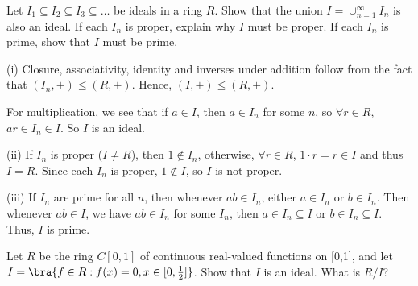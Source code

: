\begin{solution}[\bf Solution.]

\end{solution}


\begin{problem}
Let $I_1 \subseteq I_2 \subseteq I_3 \subseteq \dots$ be ideals in a ring $R$. Show that the union $I = \cup^\infty_{n=1} I_n$ is also an ideal. If each $I_n$ is proper, explain why $I$ must be proper. If each $I_n$ is prime, show that $I$ must be prime.
\end{problem}

\begin{solution}[\bf Solution.] 
\ben
\item [(i)] Closure, associativity, identity and inverses under addition follow from the fact that $(I_n,+) \leq (R,+)$. Hence, $(I,+) \leq (R,+)$.

For multiplication, we see that if $a \in I$, then $a\in I_n$ for some $n$, so $\forall r\in R$, $ar \in I_n \in I$. So $I$ is an ideal.

\item [(ii)] If $I_n$ is proper ($I \neq R$), then $1\notin I_n$, otherwise, $\forall r\in R$, $1\cdot r = r \in I$ and thus $I = R$. Since each $I_n$ is proper, $1\notin I$, so $I$ is not proper. %

\item [(iii)] If $I_n$ are prime for all $n$, then whenever $ab\in I_n$, either $a\in I_n$ or $b\in I_n$. Then whenever $ab\in I$, we have $ab\in I_n$ for some $I_n$, then $a\in I_n \subseteq I$ or $b\in I_n \subseteq I$. Thus, $I$ is prime. 
\een
\end{solution}


\begin{problem}
Let $R$ be the ring $C[0,1]$ of continuous real-valued functions on [0,1], and let $I = \bra{f\in R:f(x) = 0,x\in [0,\frac 12]}$. Show that $I$ is an ideal. What is $R/I$?
\end{problem}

